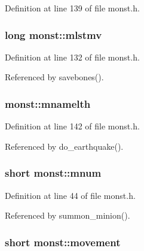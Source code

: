 Definition at line 139 of file monst.\+h.

\hypertarget{structmonst_a942c3eb47c3057fe67733f1a7be5e63b}{
\subsubsection[{mlstmv}]{\setlength{\rightskip}{0pt plus 5cm}long monst\+::mlstmv}}\label{structmonst_a942c3eb47c3057fe67733f1a7be5e63b}


Definition at line 132 of file monst.\+h.



Referenced by savebones().

\hypertarget{structmonst_a03fe7192ae1efd428bc9a0d2f856125f}{
\subsubsection[{mnamelth}]{ monst\+::mnamelth}}\label{structmonst_a03fe7192ae1efd428bc9a0d2f856125f}


Definition at line 142 of file monst.\+h.



Referenced by do\+\_\+earthquake().

\hypertarget{structmonst_a1a7aab6d8ab6271ccb21d34806c73f47}{
\subsubsection[{mnum}]{\setlength{\rightskip}{0pt plus 5cm}short monst\+::mnum}}\label{structmonst_a1a7aab6d8ab6271ccb21d34806c73f47}


Definition at line 44 of file monst.\+h.



Referenced by summon\+\_\+minion().

\hypertarget{structmonst_afe3b99a25f844e6fdfc0562e2c854023}{
\subsubsection[{movement}]{\setlength{\rightskip}{0pt plus 5cm}short monst\+::movement}}\label{structmonst_afe3b99a25f844e6fdfc0562e2c854023}


